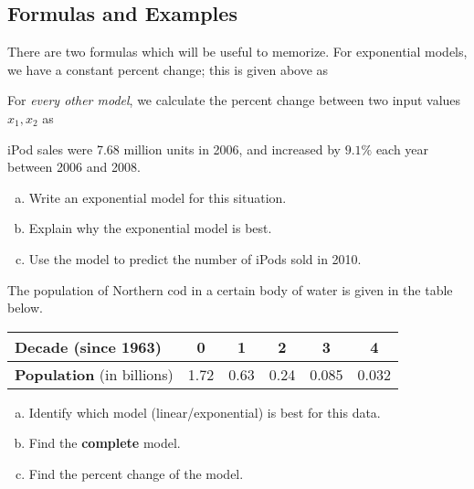 \documentclass[notes]{subfiles}
\begin{document}
	\subsection*{Formulas and Examples}
		There are two formulas which will be useful to memorize.  For exponential models, we have a constant percent change; this is given above as
			\begin{crmk}
			\end{crmk}
		For \emph{every other model}, we calculate the percent change between two input values $x_1,x_2$ as
			\begin{crmk}
			\end{crmk}
			
		\begin{ex} 
			iPod sales were 7.68 million units in 2006, and increased by $9.1\%$ each year between 2006 and 2008.  
			\begin{enumerate}[(a)]
				\item Write an exponential model for this situation.
				\item Explain why the exponential model is best.
				\item Use the model to predict the number of iPods sold in 2010.
			\end{enumerate}
		\end{ex}
			\newpage

		\begin{ex}
			The population of Northern cod in a certain body of water is given in the table below.
			\begin{center}
				{\renewcommand{\arraystretch}{1.2}
				\begin{tabular}{|l||c|c|c|c|c|}\hline
					\textbf{Decade} (since 1963) & 0 & 1 & 2 & 3 & 4\\ \hline
					\textbf{Population} (in billions) & 1.72 & 0.63 & 0.24 & 0.085 & 0.032\\ \hline
				\end{tabular}
				}
			\end{center}
			\begin{enumerate}[(a)]
				\item Identify which model (linear/exponential) is best for this data.
					\vs{.5}
				\item Find the \textbf{complete} model.
					\vs{1}			
				\item Find the percent change of the model.
					\vs{.5}
			\end{enumerate}
		\end{ex}
\end{document}
